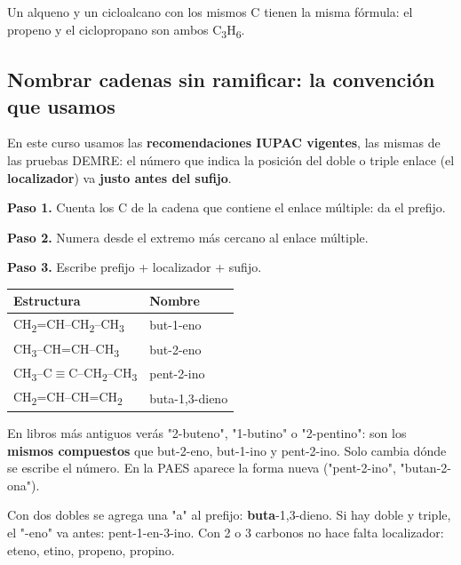 \begin{ojo}[{Ojo}] Un alqueno y un cicloalcano con los mismos C tienen la misma fórmula: el propeno y el ciclopropano son ambos C\textsubscript{3}H\textsubscript{6}.\end{ojo}
\subsection{Nombrar cadenas sin ramificar: la convención que usamos}
En este curso usamos las \textbf{recomendaciones IUPAC vigentes}, las mismas de las pruebas DEMRE: el número que indica la posición del doble o triple enlace (el \textbf{localizador}) va \textbf{justo antes del sufijo}.

 

\textbf{Paso 1.} Cuenta los C de la cadena que contiene el enlace múltiple: da el prefijo.\par \textbf{Paso 2.} Numera desde el extremo más cercano al enlace múltiple.\par \textbf{Paso 3.} Escribe prefijo + localizador + sufijo.

 
\begin{center}\small
\begin{tabular}{@{}ll@{}}
\toprule
\textbf{Estructura} & \textbf{Nombre} \\
\midrule
CH\textsubscript{2}=CH--CH\textsubscript{2}--CH\textsubscript{3} & but-1-eno \\
CH\textsubscript{3}--CH=CH--CH\textsubscript{3} & but-2-eno \\
CH\textsubscript{3}--C\ensuremath{\equiv}C--CH\textsubscript{2}--CH\textsubscript{3} & pent-2-ino \\
CH\textsubscript{2}=CH--CH=CH\textsubscript{2} & buta-1,3-dieno \\
\bottomrule
\end{tabular}
\end{center}
  
\begin{ojo} En libros más antiguos verás "2-buteno", "1-butino" o "2-pentino": son los \textbf{mismos compuestos} que but-2-eno, but-1-ino y pent-2-ino. Solo cambia dónde se escribe el número. En la PAES aparece la forma nueva ("pent-2-ino", "butan-2-ona").\end{ojo}
 
\begin{clave} Con dos dobles se agrega una "a" al prefijo: \textbf{buta}-1,3-dieno. Si hay doble y triple, el "-eno" va antes: pent-1-en-3-ino. Con 2 o 3 carbonos no hace falta localizador: eteno, etino, propeno, propino.\end{clave}
 
